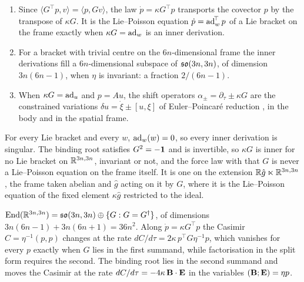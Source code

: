 \begin{proposition}
\label{prop:EAdict}
\begin{enumerate}[label=(\roman*),leftmargin=2.2em]
\item Since $\langle G^{\!\top}p,v\rangle=\langle p,Gv\rangle$, the law $\dot p=\kappa G^{\!\top}p$ transports the covector $p$ by the transpose of $\kappa G$.
It is the Lie--Poisson equation $\dot p=\operatorname{ad}_w^{\!\top}p$ of a Lie bracket on the frame exactly when $\kappa G=\operatorname{ad}_w$ is an inner derivation.
\item For a bracket with trivial centre on the $6n$-dimensional frame the inner derivations fill a $6n$-dimensional subspace of $\mathfrak{so}(3n,3n)$, of
dimension $3n(6n-1)$, when $\eta$ is invariant: a fraction $2/(6n-1)$.
\item When $\kappa G=\operatorname{ad}_u$ and $p=Au$, the shift operators $\alpha_\pm=\partial_\tau\pm\kappa G$ are the constrained variations
$\delta u=\dot\xi\pm[u,\xi]$ of Euler--Poincar\'e reduction \cite{MarsdenRatiu99,HolmMarsdenRatiu98}, in the body and in the spatial frame.
\end{enumerate}
\end{proposition}

\begin{proposition}
\label{prop:EAnotinner}
For every Lie bracket and every $w$, $\operatorname{ad}_w(w)=0$, so every inner derivation is singular. The binding root satisfies $G^2=-\mathbf 1$ and is
invertible, so $\kappa G$ is inner for no Lie bracket on $\mathbb{R}^{3n,3n}$, invariant or not, and the force law with that $G$ is never a
Lie--Poisson equation on the frame itself. It is one on the extension $\mathbb{R}\hat g\ltimes\mathbb{R}^{3n,3n}$, the frame taken abelian and $\hat g$ acting on
it by $G$, where it is the Lie--Poisson equation of the fixed element $\kappa\hat g$ restricted to the ideal.
\end{proposition}

\begin{theorem}
\label{thm:EAdichotomy}
$\operatorname{End}(\mathbb{R}^{3n,3n})=\mathfrak{so}(3n,3n)\oplus\{G:G=G^\dagger\}$, of dimensions $3n(6n-1)+3n(6n+1)=36n^2$. Along $\dot p=\kappa G^{\!\top}p$ the Casimir
$C=\eta^{-1}(p,p)$ changes at the rate $dC/d\tau=2\kappa\,p^{\!\top}G\eta^{-1}p$, which vanishes for every $p$ exactly when $G$ lies in the first
summand, while factorisation in the split form requires the second. The binding root lies in the second summand and moves the Casimir at the rate
$dC/d\tau=-4\kappa\,\mathbf B\cdot\mathbf E$ in the variables $(\mathbf B;\mathbf E)=\eta p$.
\end{theorem}

